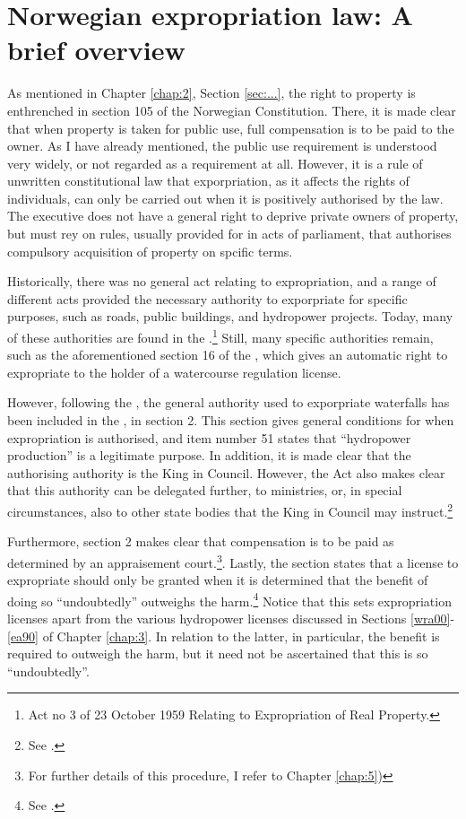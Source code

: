 \section{Norwegian expropriation law: A brief overview}

As mentioned in Chapter \ref{chap:2}, Section \ref{sec:...}, the right to property is enthrenched in section 105 of the Norwegian Constitution. There, it is made clear that when property is taken for public use, full compensation is to be paid to the owner. As I have already mentioned, the public use requirement is understood very widely, or not regarded as a requirement at all. However, it is a rule of unwritten constitutional law that exporpriation, as it affects the rights of individuals, can only be carried out when it is positively authorised by the law. The executive does not have a general right to deprive private owners of property, but must rey on rules, usually provided for in acts of parliament, that authorises compulsory acquisition of property on spcific terms.  

Historically, there was no general act relating to expropriation, and a range of different acts provided the necessary authority to exporpriate for specific purposes, such as roads, public buildings, and hydropower projects. Today, many of these authorities are found in the \cite{ea59}.\footnote{Act no 3 of 23 October 1959 Relating to Expropriation of Real Property.} Still, many specific authorities remain, such as the aforementioned section 16 of the \cite{wra17}, which gives an automatic right to expropriate to the holder of a watercourse regulation license.

However, following the \cite{wra00}, the general authority used to exporpriate waterfalls has been included in the \cite{ea59}, in section 2. This section gives general conditions for when expropriation is authorised, and item number 51 states that ``hydropower production'' is a legitimate purpose. In addition, it is made clear that the authorising authority is the King in Council. However, the Act also makes clear that this authority can be delegated further, to ministries, or, in special circumstances, also to other state bodies that the King in Council may instruct.\footnote{See \cite[5]{ea59}.} 

Furthermore, section 2 makes clear that compensation is to be paid as determined by an appraisement court.\footnote{For further details of this procedure, I refer to Chapter \ref{chap:5})}. Lastly, the section states that a license to expropriate should only be granted when it is determined that the benefit of doing so ``undoubtedly'' outweighs the harm.\footnote{See \cite[2]{ea59}.} Notice that this sets expropriation licenses apart from the various hydropower licenses discussed in Sections \ref{wra00}-\ref{ea90} of Chapter \ref{chap:3}. In relation to the latter, in particular, the benefit is required to outweigh the harm, but it need not be ascertained that this is so ``undoubtedly''.

